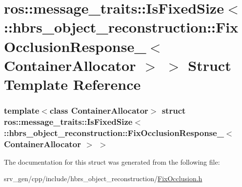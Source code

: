 \hypertarget{structros_1_1message__traits_1_1_is_fixed_size_3_01_1_1hbrs__object__reconstruction_1_1_fix_occl7984e526a28db72ca98198e3bb18498a}{\section{ros\-:\-:message\-\_\-traits\-:\-:\-Is\-Fixed\-Size$<$ \-:\-:hbrs\-\_\-object\-\_\-reconstruction\-:\-:\-Fix\-Occlusion\-Response\-\_\-$<$ \-Container\-Allocator $>$ $>$ \-Struct \-Template \-Reference}
\label{structros_1_1message__traits_1_1_is_fixed_size_3_01_1_1hbrs__object__reconstruction_1_1_fix_occl7984e526a28db72ca98198e3bb18498a}
}
\subsubsection*{template$<$class Container\-Allocator$>$ struct ros\-::message\-\_\-traits\-::\-Is\-Fixed\-Size$<$ \-::hbrs\-\_\-object\-\_\-reconstruction\-::\-Fix\-Occlusion\-Response\-\_\-$<$ Container\-Allocator $>$ $>$}



\-The documentation for this struct was generated from the following file\-:\begin{DoxyCompactItemize}
\item 
srv\-\_\-gen/cpp/include/hbrs\-\_\-object\-\_\-reconstruction/\hyperlink{_fix_occlusion_8h}{\-Fix\-Occlusion.\-h}\end{DoxyCompactItemize}
